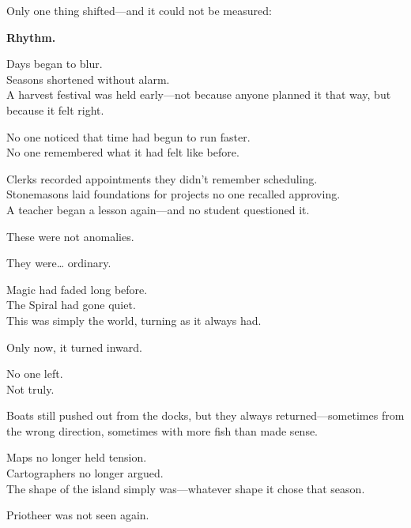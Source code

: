\documentclass[12pt]{article}
\begin{document}
\vspace{0.5em}
Only one thing shifted---and it could not be measured:

\vspace{0.5em}
\textbf{Rhythm.}

\vspace{0.5em}
Days began to blur.\\
Seasons shortened without alarm.\\
A harvest festival was held early---not because anyone planned it that way, but because it felt right.

\vspace{0.5em}
No one noticed that time had begun to run faster.\\
No one remembered what it had felt like before.

\vspace{0.5em}
Clerks recorded appointments they didn’t remember scheduling.\\
Stonemasons laid foundations for projects no one recalled approving.\\
A teacher began a lesson again---and no student questioned it.

\vspace{0.5em}
These were not anomalies.

\vspace{0.5em}
They were\ldots{} ordinary.

\vspace{0.5em}
Magic had faded long before.\\
The Spiral had gone quiet.\\
This was simply the world, turning as it always had.

\vspace{0.5em}
Only now, it turned inward.

\vspace{0.5em}
No one left.\\
Not truly.

\vspace{0.5em}
Boats still pushed out from the docks, but they always returned---sometimes from the wrong direction, sometimes with more fish than made sense.

\vspace{0.5em}
Maps no longer held tension.\\
Cartographers no longer argued.\\
The shape of the island simply was---whatever shape it chose that season.

\vspace{0.5em}
Priotheer was not seen again.
\end{document}
